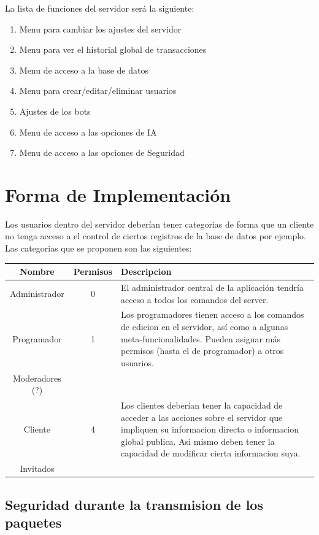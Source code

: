\documentclass{article}
\theoremstyle{definition}
\begin{document}
La lista de funciones del servidor será la siguiente:
\begin{enumerate}
\item Menu para cambiar los ajustes del servidor
\item Menu para ver el historial global de transacciones
\item Menu de acceso a la base de datos
\item Menu para crear/editar/eliminar usuarios
\item Ajustes de los bots 
\item Menu de acceso a las opciones de IA
\item Menu de acceso a las opciones de Seguridad
\end{enumerate}



\section{Forma de Implementación}




Los usuarios dentro del servidor deberían tener categorias de forma que un cliente no tenga acceso a el control de ciertos registros de la base de datos por ejemplo. Las categorias que se proponen son las siguientes:
\begin{center}
\begin{tabular}{|c|c|p{9cm}|}
\hline Nombre & Permisos & Descripcion \\
\hline Administrador & 0 & El administrador central de la aplicación tendría acceso a todos los comandos del server. \\
Programador & 1 & Los programadores tienen acceso a los comandos de edicion en el servidor, así como a algunas meta-funcionalidades. Pueden asignar más permisos (hasta el de programador) a otros usuarios.\\
Moderadores (?) & & \\
Cliente & 4 & Los clientes deberían tener la capacidad de acceder a las acciones sobre el servidor que impliquen su informacion directa o informacion global publica. Asi mismo deben tener la capacidad de modificar cierta informacion suya. \\
Invitados && \\ \hline

\end{tabular}
\end{center}

\subsection{Seguridad durante la transmision de los paquetes}
\end{document}
